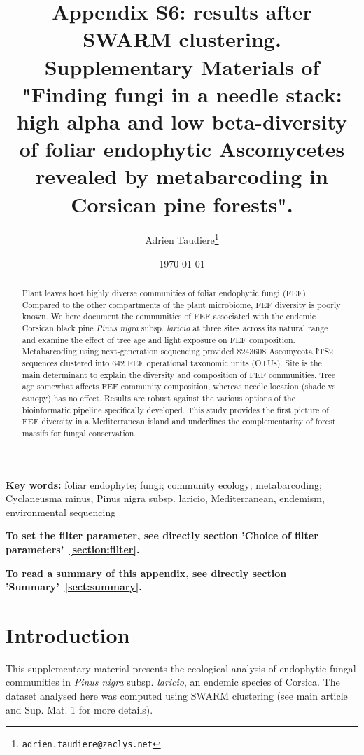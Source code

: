 \documentclass[12pt]{article}\usepackage[]{graphicx}\usepackage[]{color}
\title{Appendix S6: results after SWARM clustering. Supplementary Materials of "Finding fungi in a needle stack: high alpha and low beta-diversity of foliar endophytic Ascomycetes revealed by metabarcoding in Corsican pine forests".}
\author{Adrien Taudiere\thanks{\texttt{adrien.taudiere@zaclys.net}}}
\affil{{\footnotesize CEFE - Centre d'Ecologie Fonctionnelle et Evolutive, Montpellier: France}}
\date{\today}
\numberwithin{figure}{section}
\begin{document}






\maketitle

\begin{abstract}

Plant leaves host highly diverse communities of foliar endophytic fungi (FEF). Compared to the other compartments of the plant microbiome, FEF diversity is poorly known. We here document the communities of FEF associated with the endemic Corsican black pine \textit{Pinus nigra} subsp. \textit{laricio} at three sites across its natural range and examine the effect of tree age and light exposure on FEF composition. Metabarcoding using next-generation sequencing provided 8243608 Ascomycota ITS2 sequences clustered into 642 FEF operational taxonomic units (OTUs). Site is the main determinant to explain the diversity and composition of FEF communities. Tree age somewhat affects FEF community composition, whereas needle location (shade vs canopy) has no effect. Results are robust against the various options of the bioinformatic pipeline specifically developed. This study provides the first picture of FEF diversity in a Mediterranean island and underlines the complementarity of forest massifs for fungal conservation.

\end{abstract}


\textbf{Key words:} foliar endophyte; fungi; community ecology; metabarcoding; Cyclaneusma minus, Pinus nigra subsp. laricio, Mediterranean, endemism, environmental sequencing


\vfill
\begin{center}
\textbf{To set the filter parameter, see directly section 'Choice of filter parameters'~\ref{section:filter}.}

\textbf{To read a summary of this appendix, see directly section 'Summary'~\ref{sect:summary}.}
\end{center}

\newpage
\tableofcontents
\newpage


\section{Introduction}

This supplementary material presents the ecological analysis of endophytic fungal communities in \textit{Pinus nigra} subsp. \textit{laricio}, an endemic species of Corsica. The dataset analysed here was computed using SWARM clustering (see main article and Sup. Mat. 1 for more details).
\end{document}

